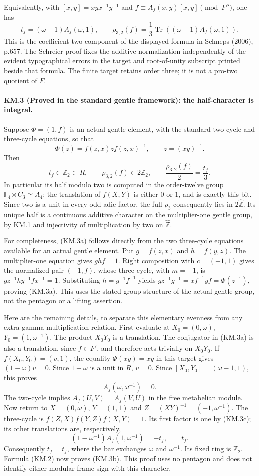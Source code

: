 Equivalently, with $[x,y]=xyx^{-1}y^{-1}$ and
$f\equiv A_f(x,y)[x,y]\pmod{F''}$, one has
\[
 t_f=(\omega-1)A_f(\omega,1),\qquad
 \rho_{3,2}(f)=\frac13\operatorname{Tr}
       ((\omega-1)A_f(\omega,1)).
\]
This is the coefficient-two component of the displayed formula
in Schneps (2006), p.657.  The Schreier proof fixes the additive
normalization independently of the evident typographical errors
in the target and root-of-unity subscript printed beside that formula.
The finite target retains order three; it is not a pro-two
quotient of $F$.

\paragraph{KM.3 (Proved in the standard gentle framework): the half-character is integral.}
Suppose $\Phi=(1,f)$ is an actual gentle element, with the standard
two-cycle and three-cycle equations, so that
\[
 \Phi(z)=f(z,x)z f(z,x)^{-1},\qquad z=(xy)^{-1}.
 \tag{KM.3a}
\]
Then
\[
 t_f\in\mathbb Z_2\subset R,\qquad
 \rho_{3,2}(f)\in2\mathbb Z_2,\qquad
 \frac{\rho_{3,2}(f)}2=\frac{t_f}3.
 \tag{KM.3b}
\]
In particular its half modulo two is computed in the order-twelve
group $\mathbb F_4\rtimes C_3\simeq A_4$: the translation of
$f(X,Y)$ is either $0$ or $1$, and is exactly this bit.
Since two is a unit in every odd-adic factor, the full
$\rho_3$ consequently lies in $2\widehat{\mathbb Z}$.
Its unique half is a continuous additive character on the
multiplier-one gentle group, by KM.1 and injectivity of
multiplication by two on $\widehat{\mathbb Z}$.

For completeness, (KM.3a) follows directly from the two three-cycle
equations available for an actual gentle element.
Put $g=f(z,x)$ and $h=f(y,z)$. The multiplier-one equation gives
$ghf=1$. Right composition with $c=(-1,1)$ gives the normalized
pair $(-1,f)$, whose three-cycle, with $m=-1$, is
$gz^{-1}hy^{-1}fx^{-1}=1$. Substituting $h=g^{-1}f^{-1}$ yields
$gz^{-1}g^{-1}=xf^{-1}yf=\Phi(z^{-1})$, proving (KM.3a).
This uses the stated group structure of the actual gentle group,
not the pentagon or a lifting assertion.

Here are the remaining details, to separate this elementary evenness from
any extra gamma multiplication relation. First evaluate at
$X_0=(0,\omega)$, $Y_0=(1,\omega^{-1})$.  The product
$X_0Y_0$ is a translation.  The conjugator in (KM.3a) is also a
translation, since $f\in F'$, and therefore acts trivially on
$X_0Y_0$.  If $f(X_0,Y_0)=(v,1)$, the equality
$\Phi(xy)=xy$ in this target gives
$(1-\omega)v=0$.  Since $1-\omega$ is a unit in $R$, $v=0$.
Since $[X_0,Y_0]=(\omega-1,1)$, this proves
\[
 A_f(\omega,\omega^{-1})=0.
 \tag{KM.3c}
\]
The two-cycle implies $A_f(U,V)=A_f(V,U)$ in the free
metabelian module.  Now return to $X=(0,\omega)$,
$Y=(1,1)$ and $Z=(XY)^{-1}=(-1,\omega^{-1})$.
The three-cycle is
$f(Z,X)f(Y,Z)f(X,Y)=1$.  Its first factor is one by
(KM.3c); its other translations are, respectively,
\[
 (1-\omega^{-1})A_f(1,\omega^{-1})=-\overline{t_f},
 \qquad t_f.
\]
Consequently $t_f=\overline{t_f}$, where the bar exchanges
$\omega$ and $\omega^{-1}$.  Its fixed ring is $\mathbb Z_2$.
Formula (KM.2) now proves (KM.3b).  This proof uses no pentagon
and does not identify either modular frame sign with this character.

